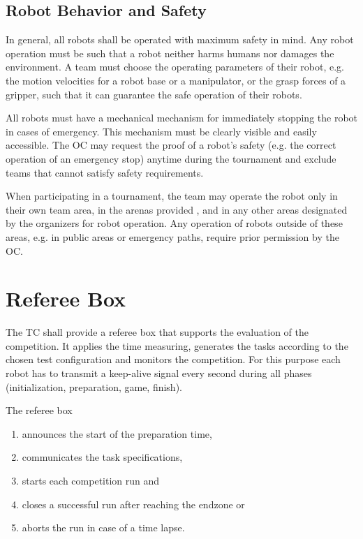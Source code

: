 \subsection{Robot Behavior and Safety}
In general, all robots shall be operated with maximum safety in mind. Any robot operation must be such that a robot neither harms humans nor damages the environment. A team must choose the operating parameters of their robot, e.g. the motion velocities for a robot base or a manipulator, or the grasp forces of a gripper, such that it can guarantee the safe operation of their robots.
\par
All robots must have a mechanical mechanism for immediately stopping the robot in cases of emergency. This mechanism must be clearly visible and easily accessible. The OC may request the proof of a robot’s safety (e.g. the correct operation of an emergency stop) anytime during the tournament and exclude teams that cannot satisfy safety requirements.
\par
When participating in a tournament, the team may operate the robot only in their own team area, in the arenas provided , and in any other areas designated by the organizers for robot operation. Any operation of robots outside of these areas, e.g. in public areas or emergency paths, require prior permission by the OC.

\section{Referee Box}
The TC shall provide a referee box that supports the evaluation of the competition. It applies the time measuring, generates the tasks according to the chosen test configuration and monitors the
competition. For this purpose each robot has to transmit a keep-alive signal every second during all phases (initialization, preparation, game, finish). 

The referee box
\begin{enumerate}
  \item announces the start of the preparation time,
  \item communicates the task specifications,
  \item starts each competition run and
  \item closes a successful run after reaching the endzone or
  \item aborts the run in case of a time lapse.
\end{enumerate}

